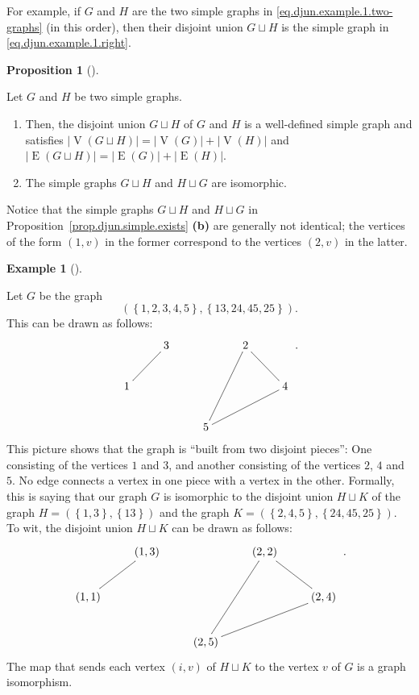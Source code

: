\documentclass[numbers=enddot,12pt,final,onecolumn,notitlepage]{scrartcl}%
\makeatletter
\theoremstyle{definition}
\newtheorem{prop}[theo]{Proposition}
\newenvironment{proposition}[1][]
{\begin{prop}[#1]\begin{leftbar}}
{\end{leftbar}\end{prop}}
\newtheorem{exam}[theo]{Example}
\newenvironment{example}[1][]
{\begin{exam}[#1]\begin{leftbar}}
{\end{leftbar}\end{exam}}
\newcommand{\set}[1]{\left\{ #1 \right\}}
\newcommand{\abs}[1]{\left| #1 \right|}
\newcommand{\tup}[1]{\left( #1 \right)}
\newcommand{\verts}[1]{\operatorname{V}\left( #1 \right)}
\newcommand{\edges}[1]{\operatorname{E}\left( #1 \right)}
\newcommand{\are}{\ar@{-}}
\makeatother
\begin{document}
For example, if $G$ and $H$ are the two simple graphs
in \eqref{eq.djun.example.1.two-graphs} (in this order),
then their disjoint union $G \sqcup H$ is the simple graph
in \eqref{eq.djun.example.1.right}.

\begin{proposition}
\label{prop.djun.simple.exists}
Let $G$ and $H$ be two simple graphs.

\begin{enumerate}

\item[\textbf{(a)}]
Then, the disjoint union $G \sqcup H$ of $G$ and $H$ is a
well-defined simple graph and satisfies
$\abs{\verts{G \sqcup H}} = \abs{\verts{G}} + \abs{\verts{H}}$
and
$\abs{\edges{G \sqcup H}} = \abs{\edges{G}} + \abs{\edges{H}}$.

\item[\textbf{(b)}]
The simple graphs $G \sqcup H$ and $H \sqcup G$ are
isomorphic.

\end{enumerate}

\end{proposition}

Notice that the simple graphs
$G \sqcup H$ and $H \sqcup G$ in
Proposition~\ref{prop.djun.simple.exists} \textbf{(b)}
are generally not identical; the vertices of the form
$\tup{1, v}$ in the former correspond to the vertices
$\tup{2, v}$ in the latter.

\begin{example}
Let $G$ be the graph
\[
\tup{ \set{1, 2, 3, 4, 5}, \set{13, 24, 45, 25} }.
\]
This can be drawn as follows:
\begin{align*}
\xymatrix{
& 3 \are[dl] & & 2 \are[rd] \are[ldd] \\
1 & & & & 4 \are[lld] \\
& & 5
} \ .
\end{align*}
This picture shows that the graph is ``built from two
disjoint pieces'': One consisting of the vertices $1$
and $3$, and another consisting of the vertices $2$, $4$
and $5$. No edge connects a vertex in one piece with
a vertex in the other.
Formally, this is saying that our graph $G$ is
isomorphic to the disjoint union $H \sqcup K$ of the
graph $H = \tup{ \set{1, 3}, \set{13} }$ and the graph
$K = \tup{ \set{2, 4, 5}, \set{24, 45, 25} }$.
To wit, the disjoint union $H \sqcup K$ can be drawn
as follows:
\begin{align*}
\xymatrix{
& \tup{1,3} \are[dl] & & \tup{2,2} \are[rd] \are[ldd] \\
\tup{1,1} & & & & \tup{2,4} \are[lld] \\
& & \tup{2,5}
} \ .
\end{align*}
The map that sends each vertex $\tup{i, v}$ of $H \sqcup K$
to the vertex $v$ of $G$ is a graph isomorphism.
\end{example}
\end{document}
